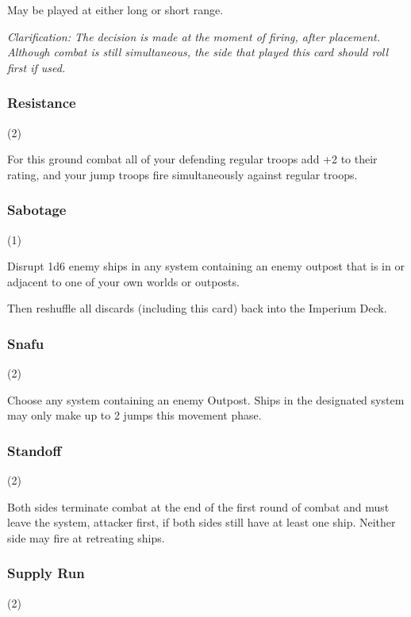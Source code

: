 \documentclass[a4paper,11pt,twocolumn]{article}
\begin{document}
May be played at either long or short range.

\textit{Clarification: The decision is made at the moment of firing, after placement. Although combat is still simultaneous, the side that played this card should roll first if used.}

\subsubsection{Resistance} (2)


For this ground combat all of your defending regular troops add +2 to their rating, and your jump troops fire simultaneously against regular troops.

\subsubsection{Sabotage} (1)


Disrupt 1d6 enemy ships in any system containing an enemy outpost that is in or adjacent to one of your own worlds or outposts.

Then reshuffle all discards (including this card) back into the Imperium Deck.

\subsubsection{Snafu} (2)


Choose any system containing an enemy Outpost. Ships in the designated system may only make up to 2 jumps this movement phase.

\subsubsection{Standoff} (2)


Both sides terminate combat at the end of the first round of combat and must leave the system, attacker first, if both sides still have at least one ship. Neither side may fire at retreating ships.

\subsubsection{Supply Run} (2)
\end{document}
